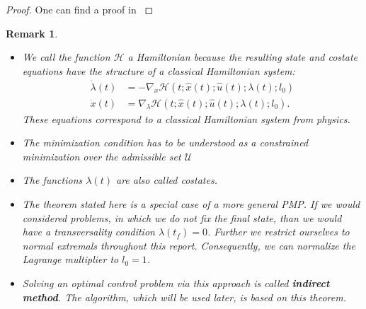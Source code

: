 \documentclass[a4paper]{article}
\theoremstyle{definitions}
\theoremstyle{bemerkung}
\newtheorem{rem}[defi]{Remark}
\theoremstyle{satz}
\theoremstyle{satz}
\begin{document}
\begin{proof}
    One can find a proof in \cite{OC}
\end{proof}

\begin{rem}
    \begin{itemize}
    
        \item We call the function $\mathcal{H}$ a Hamiltonian because the resulting state and costate equations have the structure of a classical Hamiltonian system:
        \begin{align*}
            \dot{\lambda}(t) &= - \nabla_x \mathcal{H}(t;\hat{x}(t); \hat{u}(t); \lambda(t); l_0)\\
            \dot{x}(t) &= \nabla_\lambda \mathcal{H}(t;\hat{x}(t); \hat{u}(t); \lambda(t); l_0).
        \end{align*}
        These equations correspond to a classical Hamiltonian system from physics.

        \item The minimization condition has to be understood as a constrained minimization over the admissible set $\mathcal{U}$
        \item The functions $\lambda(t)$ are also called costates.

        \item The theorem stated here is a special case of a more general PMP. If we would considered problems, in which we do not fix the final state, than we would have a transversality condition $\lambda(t_f) = 0$. Further we restrict ourselves to normal extremals throughout this report. Consequently, we can normalize the Lagrange multiplier to $l_0 =1$.

        \item Solving an optimal control problem via this approach is called \textbf{indirect method}. The algorithm, which will be used later, is based on this theorem.
    \end{itemize}
\end{rem}
\end{document}
